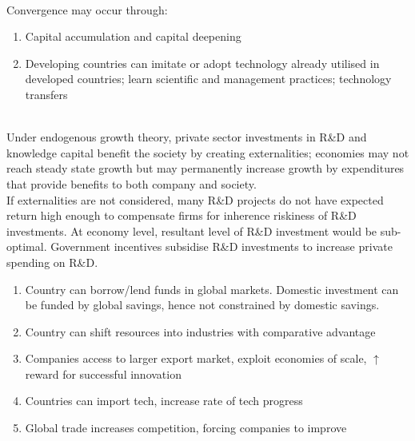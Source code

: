 \begin{remark} \\
Convergence may occur through:
\begin{enumerate}[label=\roman*.]
\setlength{\itemsep}{0pt}
\item Capital accumulation and capital deepening
\item Developing countries can imitate or adopt technology already utilised in developed countries; learn scientific and management practices; technology transfers
\end{enumerate}
\end{remark}

\begin{remark} \\
Under endogenous growth theory, private sector investments in R\&D and knowledge capital benefit the society by creating externalities; economies may not reach steady state growth but may permanently increase growth by expenditures that provide benefits to both company and society.\\
If externalities are not considered, many R\&D projects do not have expected return high enough to compensate firms for inherence riskiness of R\&D investments. At economy level, resultant level of R\&D investment would be sub-optimal. Government incentives subsidise R\&D investments to increase private spending on R\&D.
\end{remark}

\begin{remark} 
\begin{enumerate}[label=\roman*.]
\setlength{\itemsep}{0pt}
\item Country can borrow/lend funds in global markets. Domestic investment can be funded by global savings, hence not constrained by domestic savings.
\item Country can shift resources into industries with comparative advantage
\item Companies access to larger export market, exploit economies of scale, $\uparrow$ reward for successful innovation
\item Countries can import tech, increase rate of tech progress
\item Global trade increases competition, forcing companies to improve
\end{enumerate}
\end{remark}

